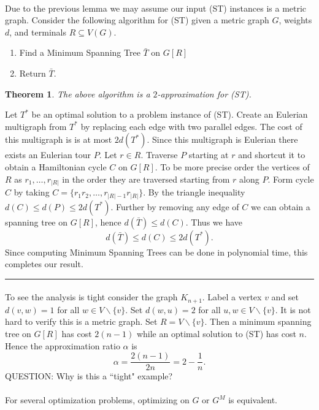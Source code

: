 \documentclass[letterpaper,12pt,oneside,onecolumn]{article}
\newenvironment{proof}{{\bf Proof:  }}{\hfill\rule{2mm}{2mm}}
\newtheorem{theorem}[fact]{Theorem}
\begin{document}
\paragraph{}
Due to the previous lemma we may assume our input (ST) instances is a metric graph. Consider the following algorithm for (ST) given a metric graph $G$, weights $d$, and terminals $R \subseteq V(G)$.
\begin{enumerate}
\item Find a Minimum Spanning Tree $\bar{T}$ on $G[R]$
\item Return $\bar{T}$.
\end{enumerate}
\begin{theorem}
The above algorithm is a $2$-approximation for (ST).
\end{theorem}
\begin{proof}
Let $T^*$ be an optimal solution to a problem instance of (ST). Create an Eulerian multigraph from $T^*$ by replacing each edge with two parallel edges. The cost of this multigraph is is at most $2d(T^*)$. Since this multigraph is Eulerian there exists an Eulerian tour $P$. Let $r \in R$. Traverse $P$ starting at $r$ and shortcut it to obtain a Hamiltonian cycle $C$ on $G[R]$. To be more precise order the vertices of $R$ as $r_1, \dots, r_{|R|}$ in the order they are traversed starting from $r$ along $P$. Form cycle $C$ by taking $C = \{r_1r_2, \dots, r_{|R|-1}r_{|R|}\}$. By the triangle inequality $d(C) \leq d(P) \leq 2d(T^*)$. Further by removing any edge of $C$ we can obtain a spanning tree on $G[R]$, hence $d(\bar{T}) \leq d(C)$.
Thus we have
$$d(\bar{T}) \leq d(C) \leq 2d(T^*).$$
Since computing Minimum Spanning Trees can be done in polynomial time, this completes our result.
\end{proof}
\paragraph{}
To see the analysis is tight consider the graph $K_{n+1}$. Label a vertex $v$ and set $d(v,w) = 1$ for all $w \in V\backslash\{v\}$. Set $d(w,u) = 2$ for all $u,w \in V\backslash\{v\}$. It is not hard to verify this is a metric graph. Set $R = V\backslash\{v\}$. Then a minimum spanning tree on $G[R]$ has cost $2(n-1)$ while an optimal solution to (ST) has cost $n$. Hence the approximation ratio $\alpha$ is
$$\alpha = \frac{2(n-1)}{2n} = 2 - \frac{1}{n}.$$
QUESTION: Why is this a ``tight" example?
\paragraph{}
For several optimization problems, optimizing on $G$ or $G^M$ is equivalent.
\end{document}

